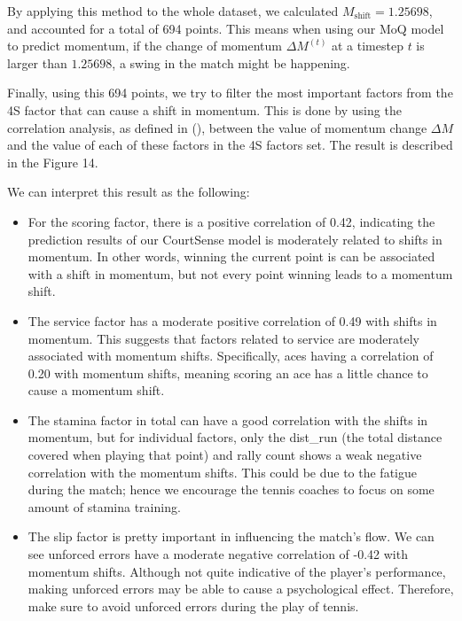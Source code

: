 \documentclass[12pt]{article}  %
\begin{document}
By applying this method to the whole dataset, we calculated $M_{\text{shift}} = 1.25698$, and accounted for a total of 694 points. This means when using our MoQ model to predict momentum, if the change of momentum $\Delta M^{(t)}$ at a timestep $t$ is larger than $1.25698$, a swing in the match might be happening.

Finally, using this 694 points, we try to filter the most important factors from the 4S factor that can cause a shift in momentum. This is done by using the correlation analysis, as defined in (), between the value of momentum change $\Delta M$ and the value of each of these factors in the 4S factors set. The result is described in the Figure 14.

We can interpret this result as the following: 
\begin{itemize}
	    \setlength{\parsep}{0ex} %
	\setlength{\topsep}{0ex} %
	\setlength{\itemsep}{0ex} %
	\item For the scoring factor, there is a positive correlation of 0.42, indicating the prediction results of our CourtSense model is moderately related to shifts in momentum. In other words, winning the current point is can be associated with a shift in momentum, but not every point winning leads to a momentum shift.
	\item The service factor has a moderate positive correlation of 0.49 with shifts in momentum. This suggests that factors related to service are moderately associated with momentum shifts. Specifically, aces having a correlation of 0.20 with momentum shifts, meaning scoring an ace has a little chance to cause a momentum shift.
	\item The stamina factor in total can have a good correlation with the shifts in momentum, but for individual factors, only the dist\_run (the total distance covered when playing that point) and rally count shows a weak negative correlation with the momentum shifts. This could be due to the fatigue during the match; hence we encourage the tennis coaches to focus on some amount of stamina training.
	\item The slip factor is pretty important in influencing the match's flow. We can see unforced errors have a moderate negative correlation of -0.42 with momentum shifts. Although not quite indicative of the player's performance, making unforced errors may be able to cause a psychological effect. Therefore, make sure to avoid unforced errors during the play of tennis.
\end{itemize}
\end{document}
